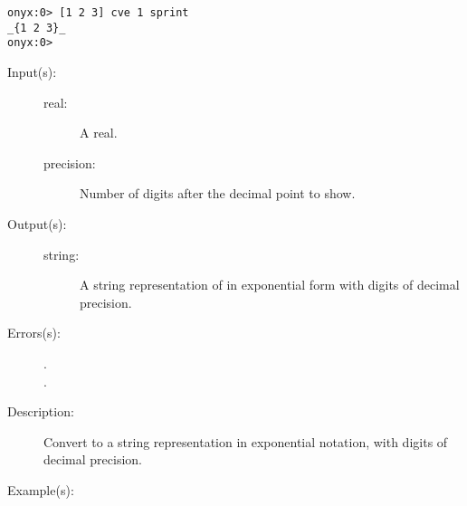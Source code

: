 \begin{description}
\begin{description}
\begin{verbatim}
onyx:0> [1 2 3] cve 1 sprint
_{1 2 3}_
onyx:0>
		\end{verbatim}
	\end{description}
\label{systemdict:cves}
\item[{\onyxop{real precision}{cves}{string}}: ]
	\begin{description}\item[]
	\item[Input(s): ]
		\begin{description}\item[]
		\item[real: ]
			A real.
		\item[precision: ]
			Number of digits after the decimal point to show.
		\end{description}
	\item[Output(s): ]
		\begin{description}\item[]
		\item[string: ]
			A string representation of  in exponential
			form with  digits of decimal precision.
		\end{description}
	\item[Errors(s): ]
		\begin{description}\item[]
		\item[.]
		\item[.]
		\end{description}
	\item[Description: ]
		Convert  to a string representation in exponential
		notation, with  digits of decimal precision.
	\item[Example(s): ]\begin{verbatim}


\end{verbatim}
\end{description}
\end{description}
